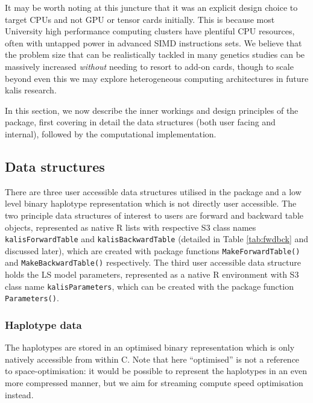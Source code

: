 \documentclass[pdflatex,referee,lineno,sn-nature]{sn-jnl}%
\let\proglang=\textsf
\newcommand{\pkg}[1]{{\fontseries{m}\fontseries{b}\selectfont #1}}
\begin{document}
It may be worth noting at this juncture that it was an explicit design choice to target CPUs and not GPU or tensor cards initially.
This is because most University high performance computing clusters have plentiful CPU resources, often with untapped power in advanced SIMD instructions sets.
We believe that the problem size that can be realistically tackled in many genetics studies can be massively increased \emph{without} needing to resort to add-on cards, though to scale beyond even this we may explore heterogeneous computing architectures in future \pkg{kalis} research.

In this section, we now describe the inner workings and design principles of the package, first covering in detail the data structures (both user facing and internal), followed by the computational implementation.



\subsection*{Data structures}
\label{data-structures}

There are three user accessible data structures utilised in the package and a low level binary haplotype representation which is not directly user accessible.
The two principle data structures of interest to users are forward and backward table objects, represented as native \proglang{R} lists with respective S3 class names \texttt{kalisForwardTable} and \texttt{kalisBackwardTable} (detailed in Table \ref{tab:fwdbck} and discussed later), which are created with package functions \texttt{MakeForwardTable()} and \texttt{MakeBackwardTable()} respectively.
The third user accessible data structure holds the LS model parameters, represented as a native \proglang{R} environment with S3 class name \texttt{kalisParameters}, which can be created with the package function \texttt{Parameters()}.



\subsubsection*{Haplotype data}
\label{sec:haplotypedata}

The haplotypes are stored in an optimised binary representation which is only natively accessible from within C.
Note that here ``optimised'' is not a reference to space-optimisation: it would be possible to represent the haplotypes in an even more compressed manner, but we aim for streaming compute speed optimisation instead.
\end{document}
